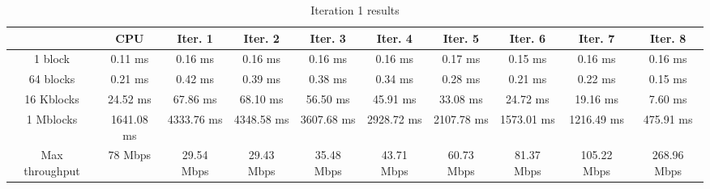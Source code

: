 \begin{table}
	\caption{Iteration 1 results}
	\centering
	\begin{tabular}{cccccccccc}
		\toprule
		 & CPU & Iter. 1 & Iter. 2 & Iter. 3 & Iter. 4 & Iter. 5 & Iter. 6 & Iter. 7 & Iter. 8 \\
		\midrule
		1 block & 0.11 ms & 0.16 ms & 0.16 ms & 0.16 ms & 0.16 ms & 0.17 ms & 0.15 ms & 0.16 ms & 0.16 ms \\
		64 blocks & 0.21 ms & 0.42 ms & 0.39 ms & 0.38 ms & 0.34 ms & 0.28 ms & 0.21 ms & 0.22 ms & 0.15 ms \\
		16 Kblocks & 24.52 ms & 67.86 ms & 68.10 ms & 56.50 ms & 45.91 ms & 33.08 ms & 24.72 ms & 19.16 ms & 7.60 ms \\
		1 Mblocks & 1641.08 ms & 4333.76 ms & 4348.58 ms & 3607.68 ms & 2928.72 ms & 2107.78 ms & 1573.01 ms & 1216.49 ms & 475.91 ms \\
		Max throughput & 78 Mbps & 29.54 Mbps & 29.43 Mbps & 35.48 Mbps & 43.71 Mbps & 60.73 Mbps & 81.37 Mbps & 105.22 Mbps & 268.96 Mbps \\
		\bottomrule
	\end{tabular}
\end{table}
